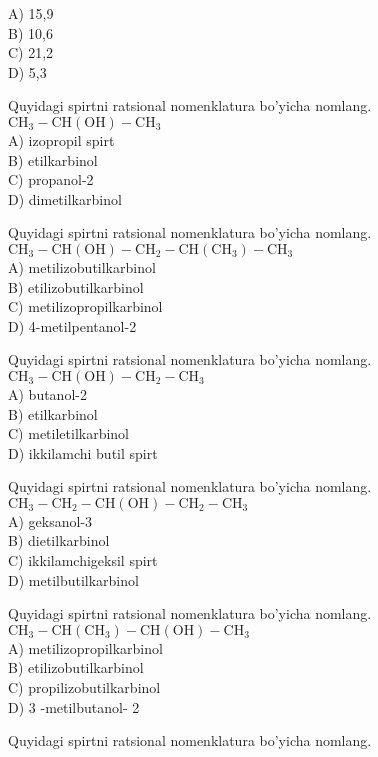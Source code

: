 A) 15,9\\
B) 10,6\\
C) 21,2\\
D) 5,3
  \item Quyidagi spirtni ratsional nomenklatura bo'yicha nomlang.\\
$\mathrm{CH}_{3}-\mathrm{CH}(\mathrm{OH})-\mathrm{CH}_{3}$\\
A) izopropil spirt\\
B) etilkarbinol\\
C) propanol-2\\
D) dimetilkarbinol
  \item Quyidagi spirtni ratsional nomenklatura bo'yicha nomlang.\\
$\mathrm{CH}_{3}-\mathrm{CH}(\mathrm{OH})-\mathrm{CH}_{2}-\mathrm{CH}\left(\mathrm{CH}_{3}\right)-\mathrm{CH}_{3}$\\
A) metilizobutilkarbinol\\
B) etilizobutilkarbinol\\
C) metilizopropilkarbinol\\
D) 4-metilpentanol-2
  \item Quyidagi spirtni ratsional nomenklatura bo'yicha nomlang.\\
$\mathrm{CH}_{3}-\mathrm{CH}(\mathrm{OH})-\mathrm{CH}_{2}-\mathrm{CH}_{3}$\\
A) butanol-2\\
B) etilkarbinol\\
C) metiletilkarbinol\\
D) ikkilamchi butil spirt
  \item Quyidagi spirtni ratsional nomenklatura bo'yicha nomlang.\\
$\mathrm{CH}_{3}-\mathrm{CH}_{2}-\mathrm{CH}(\mathrm{OH})-\mathrm{CH}_{2}-\mathrm{CH}_{3}$\\
A) geksanol-3\\
B) dietilkarbinol\\
C) ikkilamchigeksil spirt\\
D) metilbutilkarbinol
  \item Quyidagi spirtni ratsional nomenklatura bo'yicha nomlang.\\
$\mathrm{CH}_{3}-\mathrm{CH}\left(\mathrm{CH}_{3}\right)-\mathrm{CH}(\mathrm{OH})-\mathrm{CH}_{3}$\\
A) metilizopropilkarbinol\\
B) etilizobutilkarbinol\\
C) propilizobutilkarbinol\\
D) 3 -metilbutanol- 2
  \item Quyidagi spirtni ratsional nomenklatura bo'yicha nomlang.\\
